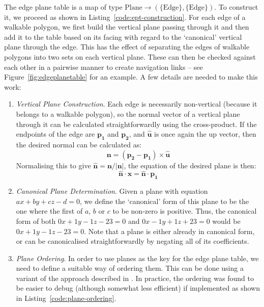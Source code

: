 \documentclass[10pt,twocolumn]{article}
\begin{document}
The edge plane table is a map of type $\mbox{Plane} \to (\{\mbox{Edge}\},\{\mbox{Edge}\})$. To construct it, we proceed as shown in Listing~\ref{code:ept-construction}. For each edge of a walkable polygon, we first build the vertical plane passing through it and then add it to the table based on its facing with regard to the `canonical' vertical plane through the edge. This has the effect of separating the edges of walkable polygons into two sets on each vertical plane. These can then be checked against each other in a pairwise manner to create navigation links -- see Figure~\ref{fig:edgeplanetable} for an example. A few details are needed to make this work:
%
\begin{enumerate}

\item \emph{Vertical Plane Construction}. Each edge is necessarily non-vertical (because it belongs to a walkable polygon), so the normal vector of a vertical plane through it can be calculated straightforwardly using the cross-product. If the endpoints of the edge are $\mathbf{p_1}$ and $\mathbf{p_2}$, and $\mathbf{\hat{u}}$ is once again the up vector, then the desired normal can be calculated as:
%
\[
\mathbf{n} = (\mathbf{p_2} - \mathbf{p_1}) \times \mathbf{\hat{u}}
\]
%
Normalising this to give $\mathbf{\hat{n}} = \mathbf{n} / \left|\mathbf{n}\right|$, the equation of the desired plane is then:
%
\[
\mathbf{\hat{n}} \cdot \mathbf{x} = \mathbf{\hat{n}} \cdot \mathbf{p_1}
\]

\item \emph{Canonical Plane Determination}. Given a plane with equation $ax + by + cz - d = 0$, we define the `canonical' form of this plane to be the one where the first of $a$, $b$ or $c$ to be non-zero is positive. Thus, the canonical form of both $0x + 1y - 1z - 23 = 0$ and $0x - 1y + 1z + 23 = 0$ would be $0x + 1y - 1z - 23 = 0$. Note that a plane is either already in canonical form, or can be canonicalised straightforwardly by negating all of its coefficients.

\item \emph{Plane Ordering}. In order to use planes as the key for the edge plane table, we need to define a suitable way of ordering them. This can be done using a variant of the approach described in \cite{salesin92}. In practice, the ordering was found to be easier to debug (although somewhat less efficient) if implemented as shown in Listing~\ref{code:plane-ordering}.

\end{enumerate}
\end{document}

